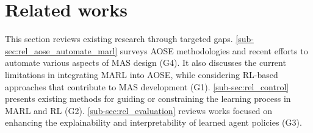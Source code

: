 \documentclass[pdflatex,sn-mathphys-num]{sn-jnl}%
\theoremstyle{thmstyleone}%
\theoremstyle{thmstyletwo}%
\theoremstyle{thmstylethree}%
\begin{document}
\section{Related works}\label{sec:related_works}

This section reviews existing research through targeted gaps. \autoref{sub-sec:rel_aose_automate_marl} surveys AOSE methodologies and recent efforts to automate various aspects of MAS design (G4). It also discusses the current limitations in integrating MARL into AOSE, while considering RL-based approaches that contribute to MAS development (G1).
\autoref{sub-sec:rel_control} presents existing methods for guiding or constraining the learning process in MARL and RL (G2).
\autoref{sub-sec:rel_evaluation} reviews works focused on enhancing the explainability and interpretability of learned agent policies (G3).
%
\end{document}
